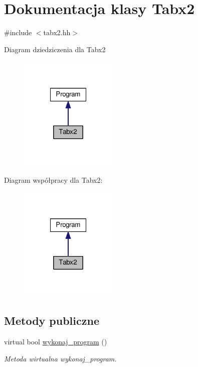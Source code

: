 \hypertarget{class_tabx2}{\section{Dokumentacja klasy Tabx2}
\label{class_tabx2}
}


{\ttfamily \#include $<$tabx2.\-hh$>$}



Diagram dziedziczenia dla Tabx2
\nopagebreak
\begin{figure}[H]
\begin{center}
\leavevmode
\includegraphics[width=132pt]{class_tabx2__inherit__graph}
\end{center}
\end{figure}


Diagram współpracy dla Tabx2\-:
\nopagebreak
\begin{figure}[H]
\begin{center}
\leavevmode
\includegraphics[width=132pt]{class_tabx2__coll__graph}
\end{center}
\end{figure}
\subsection*{Metody publiczne}
\begin{DoxyCompactItemize}
\item 
virtual bool \hyperlink{class_tabx2_a30db6636cba36a354443ec5f101fd188}{wykonaj\-\_\-program} ()
\begin{DoxyCompactList}\small\item\em Metoda wirtualna wykonaj\-\_\-program. \end{DoxyCompactList}\end{DoxyCompactItemize}
